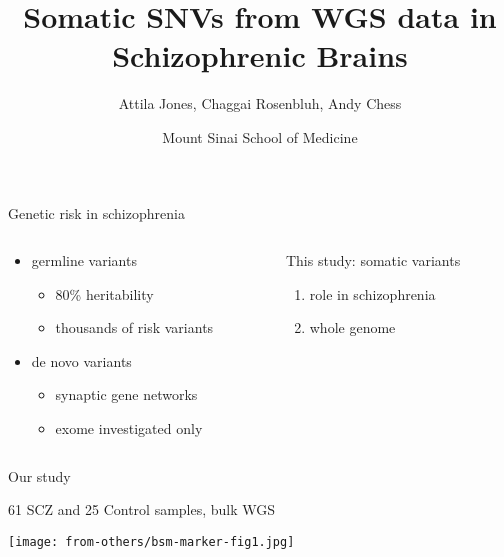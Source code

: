 \documentclass[usenames,dvipsnames]{beamer}
\title{Somatic SNVs from WGS data in Schizophrenic Brains}
\author{Attila Jones, Chaggai Rosenbluh, Andy Chess}
\date{Mount Sinai School of Medicine}
\begin{document}
\maketitle


\begin{frame}{Genetic risk in schizophrenia}
\begin{columns}[t]
\begin{column}{0.5\textwidth}
\begin{itemize}
\item germline variants
\begin{itemize}
\item 80\% heritability
\item thousands of risk variants
\end{itemize}
\item de novo variants
\begin{itemize}
        \item synaptic gene networks
	\item exome investigated only%
\end{itemize}
\end{itemize}
\end{column}
\begin{column}{0.5\textwidth}
\vfill
This study: somatic variants
\begin{enumerate}
\item role in schizophrenia
\item whole genome
\end{enumerate}
\end{column}
\end{columns}
\end{frame}


\begin{frame}{Our study}
\begin{center}
61 SCZ and 25 Control samples, bulk WGS
\end{center}
\texttt{[image: from-others/bsm-marker-fig1.jpg]}
\end{frame}
\end{document}
